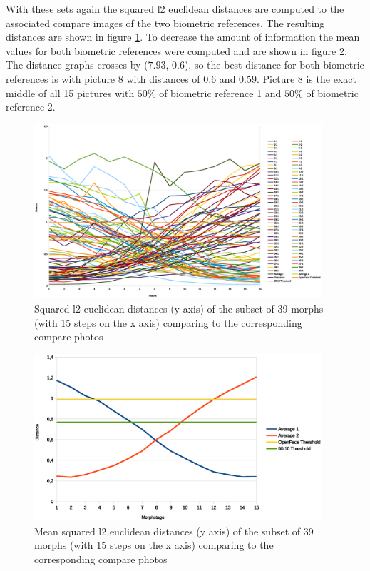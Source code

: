 With these sets again the squared l2 euclidean distances are computed to the associated compare images of the two biometric references. The resulting distances are shown in figure \ref{fig:Result39-all}. To decrease the amount of information the mean values for both biometric references were computed and are shown in figure \ref{fig:Result39-mean}. The distance graphs crosses by ($7.93$, $0.6$), so the best distance for both biometric references is with picture 8 with distances of $0.6$ and $0.59$. Picture 8 is the exact middle of all 15 pictures with $50$\% of biometric reference 1 and $50$\% of biometric reference 2.
\begin{figure}[htbp] 
	\centering
		\includegraphics[width=0.95\textwidth]{Resources/result39-allODF.eps}
	\caption{Squared l2 euclidean distances (y axis) of the subset of 39 morphs (with 15 steps on the x axis) comparing to the corresponding compare photos}
	\label{fig:Result39-all}
\end{figure}
\begin{figure}[htbp] 
	\centering
		\includegraphics[width=0.95\textwidth]{Resources/result39-meanODF.eps}
	\caption{Mean squared l2 euclidean distances (y axis) of the subset of 39 morphs (with 15 steps on the x axis) comparing to the corresponding compare photos}
	\label{fig:Result39-mean}
\end{figure}

